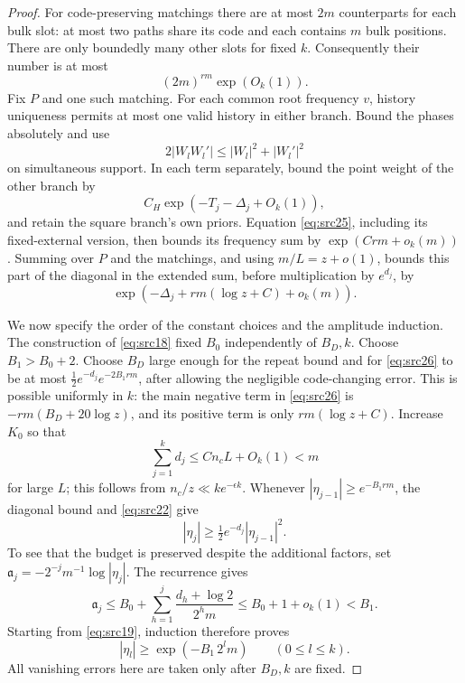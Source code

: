 \begin{proof}
For code-preserving matchings there are at most \(2m\)
counterparts for each bulk slot: at most two paths share
its code and each contains \(m\) bulk positions.
There are only boundedly many other slots for fixed \(k\).
Consequently their number is at most
\[
 (2m)^{rm}\exp(O_k(1)).
\]
Fix \(P\) and one such matching. For each common root
frequency \(v\), history uniqueness permits at most one
valid history in either branch. Bound the phases absolutely
and use
\[
 2|W_lW_l'|\le |W_l|^2+|W_l'|^2
\]
on simultaneous support. In each term separately, bound
the point weight of the other branch by
\[
 C_H\exp(-T_j-\Delta_j+O_k(1)),
\]
and retain the square branch's own priors. Equation
\eqref{eq:src25}, including its fixed-external version,
then bounds its frequency sum by
\(\exp(Crm+o_k(m))\). Summing over \(P\) and the matchings,
and using \(m/L=z+o(1)\), bounds this part of the diagonal
in the extended sum, before multiplication by \(e^{d_j}\),
by
\begin{equation}\label{eq:src26}
 \exp\!\left(-\Delta_j+rm(\log z+C)+o_k(m)\right).
\end{equation}

We now specify the order of the constant choices and the
amplitude induction. The construction of
\eqref{eq:src18} fixed \(B_0\) independently of \(B_D,k\).
Choose \(B_1>B_0+2\). Choose \(B_D\) large enough for the
repeat bound and for
\eqref{eq:src26} to be at most
\(\tfrac12 e^{-d_j}e^{-2B_1rm}\), after allowing the
negligible code-changing error.
This is possible uniformly in \(k\): the main negative
term in \eqref{eq:src26} is
\(-rm(B_D+20\log z)\), and its positive term is only
\(rm(\log z+C)\).
Increase \(K_0\) so that
\[
 \sum_{j=1}^k d_j\le Cn_cL+O_k(1)<m
\]
for large \(L\); this follows from
\(n_c/z\ll k e^{-\epsilon k}\).
Whenever \(|\eta_{j-1}|\ge e^{-B_1rm}\), the diagonal
bound and \eqref{eq:src22} give
\[
 |\eta_j|\ge \tfrac12e^{-d_j}|\eta_{j-1}|^2.
\]
To see that the budget is preserved despite the additional
factors, set \(\mathfrak a_j=-2^{-j}m^{-1}\log|\eta_j|\).
The recurrence gives
\[
 \mathfrak a_j\le B_0+
       \sum_{h=1}^j\frac{d_h+\log2}{2^hm}
       \le B_0+1+o_k(1)<B_1.
\]
Starting from \eqref{eq:src19}, induction therefore proves
\begin{equation}\label{eq:characters-amplitude-budget}
 |\eta_l|\ge \exp(-B_1\,2^lm)
 \qquad(0\le l\le k).
\end{equation}
All vanishing errors here are taken only after \(B_D,k\)
are fixed.


\end{proof}

